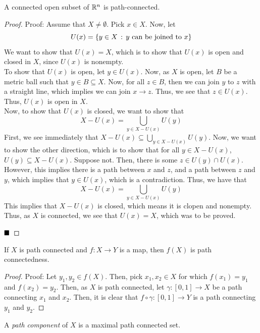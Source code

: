 \begin{lemma}
    A connected open subset of $\mathbb{R}^n$ is path-connected.   
\end{lemma}
\begin{proof}{Proof:}
    Assume that $X \ne \emptyset$. Pick $x \in X$. Now, let 
    \[ U(x) = \{y \in X \, :\, y \text{ can be joined to }x\} \]
    We want to show that $U(x) = X$, which is to show that $U(x)$ is open and closed in $X$, since $U(x)$ is nonempty.\\

    To show that $U(x)$ is open, let $y \in U(x)$. Now, as $X$ is open, let $B$ be a metric ball such that $y \in B \subseteq X$. Now, for all $z \in B$, then we can join $y$ to $z$ with a straight line, which implies we can join $x \to z$. Thus, we see that $z \in U(x)$. Thus, $U(x)$ is open in $X$.\\

    Now, to show that $U(x)$ is closed, we want to show that
    \[ X - U(x) = \bigcup_{y \in X - U(x)} U(y) \]
    First, we see immediately that $X - U(x) \subseteq \bigcup_{y \in X - U(x)}U(y)$. Now, we want to show the other direction, which is to show that for all $y \in X - U(x)$, $U(y) \subseteq X - U(x)$. Suppose not. Then, there is some $z \in U(y) \cap U(x)$. However, this implies there is a path between $x$ and $z$, and a path between $z$ and $y$, which implies that $y \in U(x)$, which is a contradiction. Thus, we have that
    \[ X - U(x) = \bigcup_{y \in X - U(x)}U(y) \]
    This implies that $X - U(x)$ is closed, which means it is clopen and nonempty. Thus, as $X$ is connected, we see that $U(x) = X$, which was to be proved. 
    
    $\qed$
\end{proof}

\begin{lemma}
    If $X$ is path connected and $f : X \to Y$ is a map, then $f(X)$ is path connectedness. 
\end{lemma}
\begin{proof}{Proof:}
    Let $y_1, y_2 \in f(X)$. Then, pick $x_1, x_2 \in X$ for which $f(x_1) = y_1$ and $f(x_2) = y_2$. Then, as $X$ is path connected, let $\gamma : [0, 1] \to X$ be a path connecting $x_1$ and $x_2$. Then, it is clear that $f \circ \gamma : [0, 1] \to Y$ is a path connecting $y_1$ and $y_2$. 
\end{proof}

\begin{definition}
    A \emph{path component} of $X$ is a maximal path connected set. 
\end{definition}

